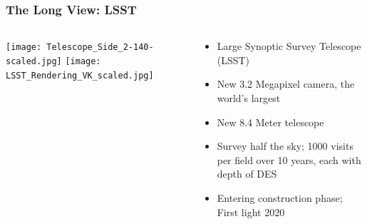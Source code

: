 \documentclass{beamer}
\begin{document}
\frame
{
    \frametitle{The Long View: LSST}

    \begin{columns}

        \begin{column}{0.5\textwidth}    
            \texttt{[image: Telescope\_Side\_2-140-scaled.jpg]}
            \newline
            \texttt{[image: LSST\_Rendering\_VK\_scaled.jpg]}
        \end{column}

        \begin{column}{0.5\textwidth}    

            \begin{itemize}

                \item Large Synoptic Survey Telescope (LSST)

                \item New 3.2 Megapixel camera, the world's largest

                \item New 8.4 Meter telescope

                \item Survey half the sky; 1000 visits per field over 10 years, each
                    with depth of DES 

                \item Entering construction phase; First light 2020

            \end{itemize}
        \end{column}


    \end{columns}
}
\end{document}

